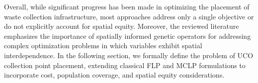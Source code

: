 Overall, while significant progress has been made in optimizing the placement of waste collection infrastructure, most approaches address only a single objective or do not explicitly account for spatial equity. Moreover, the reviewed literature emphasizes the importance of spatially informed genetic operators for addressing complex optimization problems in which variables exhibit spatial interdependence. 
In the following section, we formally define the problem of UCO collection point placement, extending classical FLP and MCLP formulations to incorporate cost, population coverage, and spatial equity considerations.